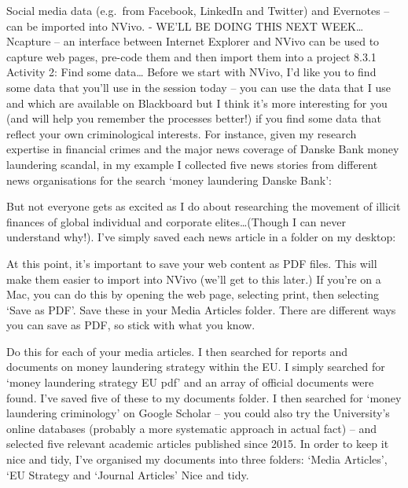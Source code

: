 \documentclass[
]{book}
\begin{document}
\begin{itemize}
\begin{itemize}
    Social media data (e.g.~from Facebook, LinkedIn and Twitter) and Evernotes -- can be imported into NVivo. - WE'LL BE DOING THIS NEXT WEEK\ldots{}
    Ncapture -- an interface between Internet Explorer and NVivo can be used to capture web pages, pre-code them and then import them into a project
    8.3.1 Activity 2: Find some data\ldots{}
    Before we start with NVivo, I'd like you to find some data that you'll use in the session today -- you can use the data that I use and which are available on Blackboard but I think it's more interesting for you (and will help you remember the processes better!) if you find some data that reflect your own criminological interests.
    For instance, given my research expertise in financial crimes and the major news coverage of Danske Bank money laundering scandal, in my example I collected five news stories from different news organisations for the search `money laundering Danske Bank':
  \end{itemize}
\end{itemize}

But not everyone gets as excited as I do about researching the movement of illicit finances of global individual and corporate elites\ldots(Though I can never understand why!).
I've simply saved each news article in a folder on my desktop:

At this point, it's important to save your web content as PDF files. This will make them easier to import into NVivo (we'll get to this later.) If you're on a Mac, you can do this by opening the web page, selecting print, then selecting `Save as PDF'. Save these in your Media Articles folder. There are different ways you can save as PDF, so stick with what you know.

Do this for each of your media articles.
I then searched for reports and documents on money laundering strategy within the EU. I simply searched for `money laundering strategy EU pdf' and an array of official documents were found. I've saved five of these to my documents folder.
I then searched for `money laundering criminology' on Google Scholar -- you could also try the University's online databases (probably a more systematic approach in actual fact) -- and selected five relevant academic articles published since 2015.
In order to keep it nice and tidy, I've organised my documents into three folders: `Media Articles', `EU Strategy and `Journal Articles'
Nice and tidy.
\end{document}
